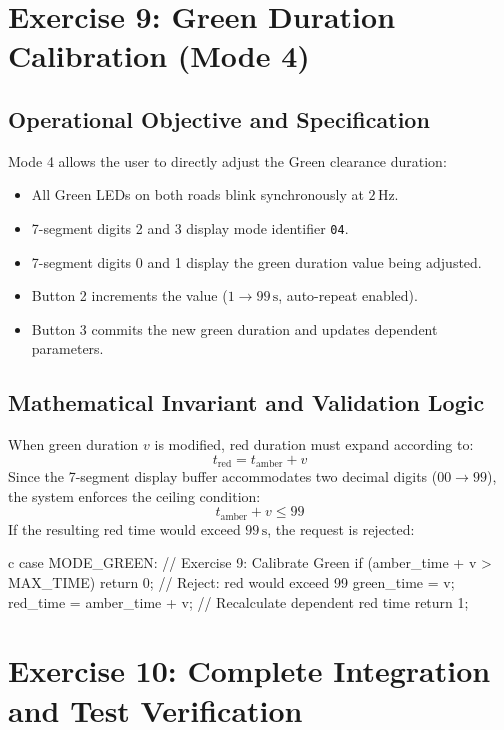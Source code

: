 \documentclass{hcmut-report}
\begin{document}
\newpage
\section{Exercise 9: Green Duration Calibration (Mode 4)}

\subsection{Operational Objective and Specification}
Mode 4 allows the user to directly adjust the Green clearance duration:
\begin{itemize}
    \item All Green LEDs on both roads blink synchronously at $2\,\text{Hz}$.
    \item 7-segment digits 2 and 3 display mode identifier \texttt{04}.
    \item 7-segment digits 0 and 1 display the green duration value being adjusted.
    \item Button 2 increments the value ($1 \to 99\,\text{s}$, auto-repeat enabled).
    \item Button 3 commits the new green duration and updates dependent parameters.
\end{itemize}

\subsection{Mathematical Invariant and Validation Logic}
When green duration $v$ is modified, red duration must expand according to:
\begin{equation}
    t_{\text{red}} = t_{\text{amber}} + v
\end{equation}
Since the 7-segment display buffer accommodates two decimal digits ($00 \to 99$), the system enforces the ceiling condition:
\begin{equation}
    t_{\text{amber}} + v \le 99
\end{equation}
If the resulting red time would exceed $99\,\text{s}$, the request is rejected:

\begin{code}{c}
case MODE_GREEN:                              // Exercise 9: Calibrate Green
  if (amber_time + v > MAX_TIME) return 0;    // Reject: red would exceed 99
  green_time = v;
  red_time   = amber_time + v;                // Recalculate dependent red time
  return 1;
\end{code}


\newpage
\section{Exercise 10: Complete Integration and Test Verification}
\end{document}
